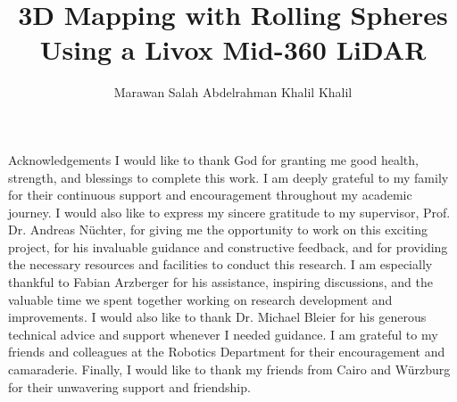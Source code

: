\documentclass[english, bachelor, utf8]{base/thesis_telematics}
\begin{document}
\title{3D Mapping with Rolling Spheres Using a Livox Mid-360 LiDAR}
\author{Marawan Salah Abdelrahman Khalil Khalil}
\secondSupervisor{}

\generatetitle

\cleardoublepage    

\begin{prefacesection}{Acknowledgements}
I would like to thank God for granting me good health, strength, and blessings to complete this work.
I am deeply grateful to my family for their continuous support and encouragement throughout my academic journey.
I would also like to express my sincere gratitude to my supervisor, Prof. Dr. Andreas Nüchter, for giving me the opportunity to work on this exciting project, for his invaluable guidance and constructive feedback, and for providing the necessary resources and facilities to conduct this research.
I am especially thankful to Fabian Arzberger for his assistance, inspiring discussions, and the valuable time we spent together working on research development and improvements.
I would also like to thank Dr. Michael Bleier for his generous technical advice and support whenever I needed guidance.
I am grateful to my friends and colleagues at the Robotics Department for their encouragement and camaraderie.
Finally, I would like to thank my friends from Cairo and Würzburg for their unwavering support and friendship.
\end{prefacesection}

\newpage
\end{document}
